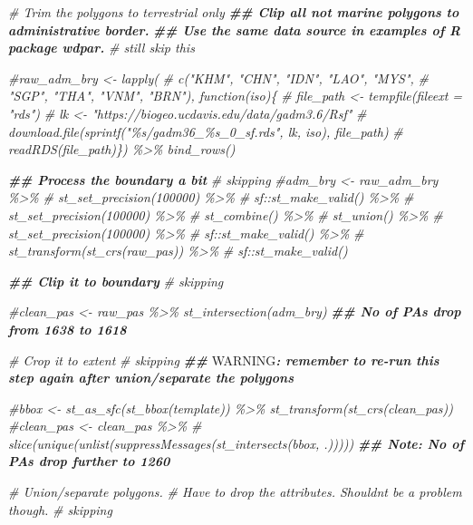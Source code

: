 \documentclass[
]{article}
\newenvironment{Shaded}{\begin{snugshade}}{\end{snugshade}}
\newcommand{\AlertTok}[1]{\textcolor[rgb]{0.94,0.16,0.16}{#1}}
\newcommand{\CommentTok}[1]{\textcolor[rgb]{0.56,0.35,0.01}{\textit{#1}}}
\newcommand{\DocumentationTok}[1]{\textcolor[rgb]{0.56,0.35,0.01}{\textbf{\textit{#1}}}}
\begin{document}
\begin{Shaded}
\begin{Highlighting}[]
\CommentTok{\# Trim the polygons to terrestrial only}
\DocumentationTok{\#\# Clip all not marine polygons to administrative border.}
\DocumentationTok{\#\# Use the same data source in examples of R package wdpar.}
\CommentTok{\# still skip this}

\CommentTok{\#raw\_adm\_bry \textless{}{-} lapply(}
\CommentTok{\#    c("KHM", "CHN", "IDN", "LAO", "MYS", }
\CommentTok{\#      "SGP", "THA", "VNM", "BRN"), function(iso)\{}
\CommentTok{\#          file\_path \textless{}{-} tempfile(fileext = "rds")}
\CommentTok{\#          lk \textless{}{-} "https://biogeo.ucdavis.edu/data/gadm3.6/Rsf"}
\CommentTok{\#          download.file(sprintf("\%s/gadm36\_\%s\_0\_sf.rds", lk, iso), file\_path)}
\CommentTok{\#          readRDS(file\_path)\}) \%\textgreater{}\% bind\_rows()}

\DocumentationTok{\#\# Process the boundary a bit}
\CommentTok{\# skipping}
\CommentTok{\#adm\_bry \textless{}{-} raw\_adm\_bry \%\textgreater{}\%}
\CommentTok{\#    st\_set\_precision(100000) \%\textgreater{}\%}
\CommentTok{\#    sf::st\_make\_valid() \%\textgreater{}\%}
\CommentTok{\#    st\_set\_precision(100000) \%\textgreater{}\%}
\CommentTok{\#    st\_combine() \%\textgreater{}\%}
\CommentTok{\#    st\_union() \%\textgreater{}\%}
\CommentTok{\#    st\_set\_precision(100000) \%\textgreater{}\%}
\CommentTok{\#    sf::st\_make\_valid() \%\textgreater{}\%}
\CommentTok{\#    st\_transform(st\_crs(raw\_pas)) \%\textgreater{}\%}
\CommentTok{\#    sf::st\_make\_valid()}

\DocumentationTok{\#\# Clip it to boundary}
\CommentTok{\# skipping}

\CommentTok{\#clean\_pas \textless{}{-} raw\_pas \%\textgreater{}\% st\_intersection(adm\_bry)}
\DocumentationTok{\#\# No of PAs drop from 1638 to 1618}

\CommentTok{\# Crop it to extent}
\CommentTok{\# skipping}
\DocumentationTok{\#\# }\AlertTok{WARNING}\DocumentationTok{: remember to re{-}run this step again after union/separate the polygons}

\CommentTok{\#bbox \textless{}{-} st\_as\_sfc(st\_bbox(template)) \%\textgreater{}\% st\_transform(st\_crs(clean\_pas))}
\CommentTok{\#clean\_pas \textless{}{-} clean\_pas \%\textgreater{}\% }
\CommentTok{\#    slice(unique(unlist(suppressMessages(st\_intersects(bbox, .)))))}
\DocumentationTok{\#\# Note: No of PAs drop further to 1260}

\CommentTok{\# Union/separate polygons.}
\CommentTok{\# Have to drop the attributes. Shouldn\textquotesingle{}t be a problem though.}
\CommentTok{\# skipping}


\end{Highlighting}
\end{Shaded}
\end{document}
